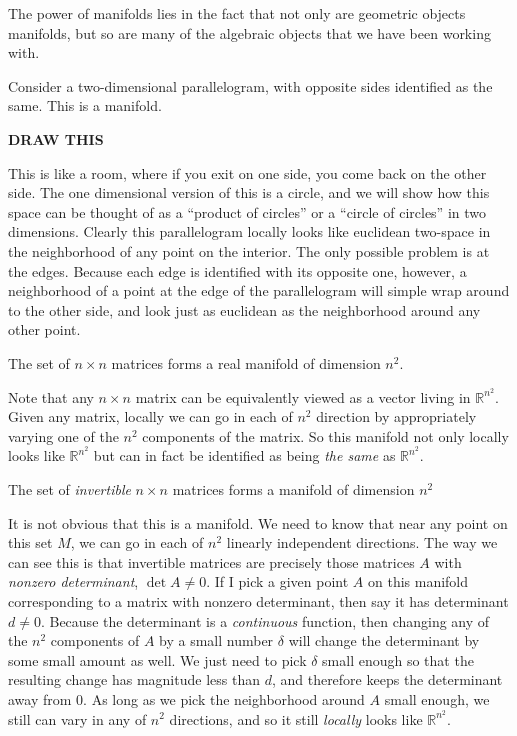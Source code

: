 	The power of manifolds lies in the fact that not only are geometric objects manifolds, but so are many of the algebraic objects that we have been working with. 
	
	\begin{example}\label{ex:secret_torus}
		Consider a two-dimensional parallelogram, with opposite sides identified as the same. This is a manifold.
	\end{example}
	
	\textbf{DRAW THIS}
	
	This is like a room, where if you exit on one side, you come back on the other side. The one dimensional version of this is a circle, and we will show how this space can be thought of as a ``product of circles'' or a ``circle of circles'' in two dimensions. Clearly this parallelogram locally looks like euclidean two-space in the neighborhood of any point on the interior. The only possible problem is at the edges. Because each edge is identified with its opposite one, however, a neighborhood of a point at the edge of the parallelogram will simple wrap around to the other side, and look just as euclidean as the neighborhood around any other point.
	
	\begin{example}\label{ex:M_n}
		The set of $n \times n$ matrices forms a real manifold of dimension $n^2$.
	\end{example}
	Note that any $n \times n$ matrix can be equivalently viewed as a vector living in $\mathbb R^{n^2}$. Given any matrix, locally we can go in each of $n^2$ direction by appropriately varying one of the $n^2$ components of the matrix. So this manifold not only locally looks like $\mathbb R^{n^2}$ but can in fact be identified as being \emph{the same} as $\mathbb R^{n^2}$.
	
	\begin{example}\label{ex:GL_n}
		The set of \emph{invertible} $n\times n$ matrices forms a manifold of dimension $n^2$
	\end{example}
	It is not obvious that this is a manifold. We need to know that near any point on this set $M$, we can go in each of $n^2$ linearly independent directions. The way we can see this is that invertible matrices are precisely those matrices $A$ with \emph{nonzero determinant}, $\det A \neq 0$. If I pick a given point $A$ on this manifold corresponding to a matrix with nonzero determinant, then say it has determinant $d \neq 0$. Because the determinant is a \emph{continuous} function, then changing any of the $n^2$ components of $A$ by a small number $\delta$ will change the determinant by some small amount as well. We just need to pick $\delta$ small enough so that the resulting change has magnitude less than $d$, and therefore keeps the determinant away from $0$. As long as we pick the neighborhood around $A$ small enough, we still can vary in any of $n^2$ directions, and so it still \emph{locally} looks like $\mathbb R^{n^2}$. 
	
